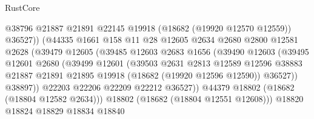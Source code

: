 \begin{lexlean}{RustCore}
\begin{coremodule}
                                  @38796
                                  @21887
                                  @21891
                                  @22145
                                  @19918
                                  (@18682 (@19920 @12570 @12559))
                                  @36527))
                              (@44335
                                @1661
                                @158
                                @11
                                @28
                                @12605
                                @2634
                                @2680
                                @2800
                                @12581
                                @2628
                                (@39479
                                  @12605
                                  (@39485
                                    @12603
                                    @2683
                                    @1656
                                    (@39490
                                      @12603
                                      (@39495
                                        @12601
                                        @2680
                                        (@39499
                                          @12601
                                          (@39503
                                            @2631
                                            @2813
                                            @12589
                                            @12596
                                            @38883
                                            @21887
                                            @21891
                                            @21895
                                            @19918
                                            (@18682 (@19920 @12596 @12590))
                                            @36527))
                                        @38897))
                                    @22203
                                    @22206
                                    @22209
                                    @22212
                                    @36527))
                                @44379
                                @18802
                                (@18682 (@18804 @12582 @2634)))
                              @18802
                              (@18682 (@18804 @12551 @12608)))
                            @18820
                            @18824
                            @18829
                            @18834
                            @18840

\end{coremodule}
\end{lexlean}
